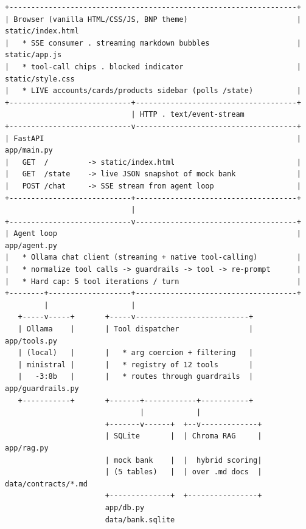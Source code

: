 \documentclass[11pt]{article}
\begin{document}
\begin{lstlisting}[style=plain]
+------------------------------------------------------------------+
| Browser (vanilla HTML/CSS/JS, BNP theme)                         |  static/index.html
|   * SSE consumer . streaming markdown bubbles                    |  static/app.js
|   * tool-call chips . blocked indicator                          |  static/style.css
|   * LIVE accounts/cards/products sidebar (polls /state)          |
+----------------------------+-------------------------------------+
                             | HTTP . text/event-stream
+----------------------------v-------------------------------------+
| FastAPI                                                          |  app/main.py
|   GET  /         -> static/index.html                            |
|   GET  /state    -> live JSON snapshot of mock bank              |
|   POST /chat     -> SSE stream from agent loop                   |
+----------------------------+-------------------------------------+
                             |
+----------------------------v-------------------------------------+
| Agent loop                                                       |  app/agent.py
|   * Ollama chat client (streaming + native tool-calling)         |
|   * normalize tool calls -> guardrails -> tool -> re-prompt      |
|   * Hard cap: 5 tool iterations / turn                           |
+--------+-------------------+-------------------------------------+
         |                   |
   +-----v-----+       +-----v--------------------------+
   | Ollama    |       | Tool dispatcher                |  app/tools.py
   | (local)   |       |   * arg coercion + filtering   |
   | ministral |       |   * registry of 12 tools       |
   |   -3:8b   |       |   * routes through guardrails  |  app/guardrails.py
   +-----------+       +-------+------------+-----------+
                               |            |
                       +-------v------+  +--v-------------+
                       | SQLite       |  | Chroma RAG     |  app/rag.py
                       | mock bank    |  |  hybrid scoring|
                       | (5 tables)   |  | over .md docs  |  data/contracts/*.md
                       +--------------+  +----------------+
                       app/db.py
                       data/bank.sqlite
\end{lstlisting}
\end{document}
